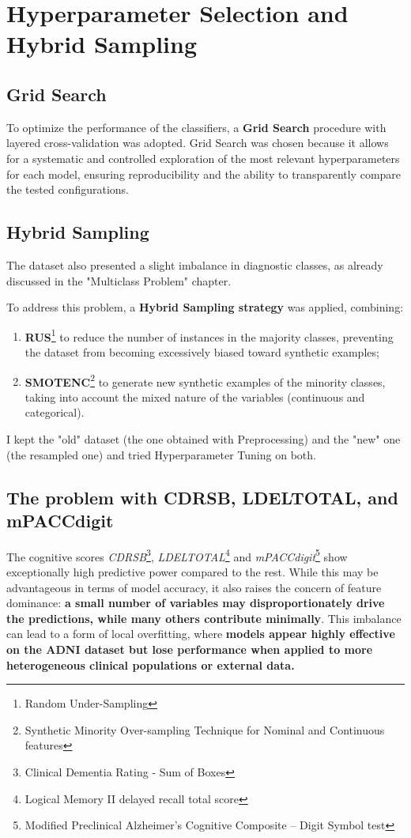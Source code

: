 \section{Hyperparameter Selection and Hybrid Sampling}
\subsection{Grid Search}
To optimize the performance of the classifiers, a \textbf{Grid Search} procedure with layered cross-validation was adopted. Grid Search was chosen because it allows for a systematic and controlled exploration of the most relevant hyperparameters for each model, ensuring reproducibility and the ability to transparently compare the tested configurations.

\subsection{Hybrid Sampling}
The dataset also presented a slight imbalance in diagnostic classes, as already discussed in the "Multiclass Problem" chapter. 

To address this problem, a \textbf{Hybrid Sampling strategy} was applied, combining:
\begin{enumerate}
	\item \textbf{RUS}\footnote{Random Under-Sampling} to reduce the number of instances in the majority classes, preventing the dataset from becoming excessively biased toward synthetic examples;
	\item \textbf{SMOTENC}\footnote{Synthetic Minority Over-sampling Technique for Nominal and Continuous features} to generate new synthetic examples of the minority classes, taking into account the mixed nature of the variables (continuous and categorical).
\end{enumerate}
I kept the "old" dataset (the one obtained with Preprocessing) and the "new" one (the resampled one) and tried Hyperparameter Tuning on both. 

\subsection{The problem with CDRSB, LDELTOTAL, and mPACCdigit}
The cognitive scores \textit{CDRSB}\footnote{Clinical Dementia Rating - Sum of Boxes}, \textit{LDELTOTAL}\footnote{Logical Memory II delayed recall total score} and \textit{mPACCdigit}\footnote{Modified Preclinical Alzheimer’s Cognitive Composite – Digit Symbol test} show exceptionally high predictive power compared to the rest. While this may be advantageous in terms of model accuracy, it also raises the concern of feature dominance: \textbf{a small number of variables may disproportionately drive the predictions, while many others contribute minimally}. This imbalance can lead to a form of local overfitting, where \textbf{models appear highly effective on the ADNI dataset but lose performance when applied to more heterogeneous clinical populations or external data.}

